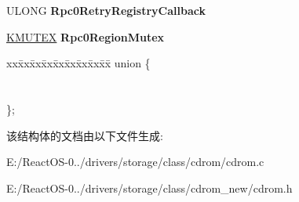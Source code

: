 \begin{DoxyCompactItemize}
U\+L\+O\+NG {\bfseries Rpc0\+Retry\+Registry\+Callback}
\item 
\mbox{\label{struct___c_d_r_o_m___d_a_t_a_a9c2ff49b91d7938b72e93dff7bf6e240}} 
\hyperlink{struct___k_m_u_t_a_n_t}{K\+M\+U\+T\+EX} {\bfseries Rpc0\+Region\+Mutex}
\item 
\mbox{\label{struct___c_d_r_o_m___d_a_t_a_a647b8210ea8d87026bb00469f19f1aee}} 
\begin{tabbing}
xx\=xx\=xx\=xx\=xx\=xx\=xx\=xx\=xx\=\kill
union \{\\
\\
\\
\}; \\

\end{tabbing}\end{DoxyCompactItemize}


该结构体的文档由以下文件生成\+:\begin{DoxyCompactItemize}
\item 
E\+:/\+React\+O\+S-\/0../drivers/storage/class/cdrom/cdrom.\+c\item 
E\+:/\+React\+O\+S-\/0../drivers/storage/class/cdrom\+\_\+new/cdrom.\+h\end{DoxyCompactItemize}
